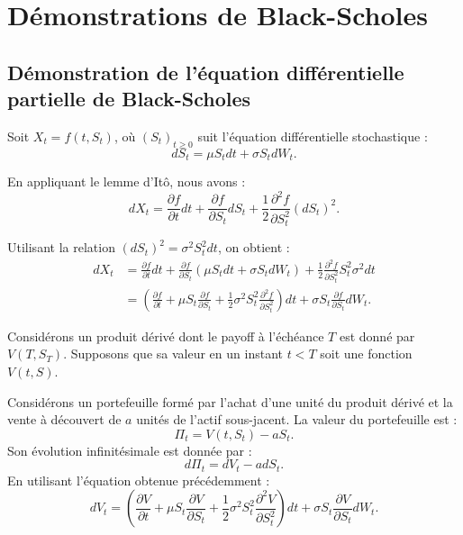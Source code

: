 
\chapter{Démonstrations de Black-Scholes}

\section{Démonstration de l'équation différentielle partielle de Black-Scholes}
\label{app:BS edp}

Soit $X_t = f(t, S_t)$, où $(S_t)_{t\geq0}$ suit l'équation différentielle stochastique :
\begin{equation}
    dS_t = \mu S_t dt + \sigma S_t dW_t.
\end{equation}

En appliquant le lemme d'Itô, nous avons :
\begin{equation}
    dX_t = \frac{\partial f}{\partial t} dt + \frac{\partial f}{\partial S_t} dS_t + \frac{1}{2} \frac{\partial^2 f}{\partial S_t^2} (dS_t)^2.
\end{equation}

Utilisant la relation $(dS_t)^2 = \sigma^2 S_t^2 dt$, on obtient :
\begin{align}
    dX_t &= \frac{\partial f}{\partial t} dt + \frac{\partial f}{\partial S_t} (\mu S_t dt + \sigma S_t dW_t) + \frac{1}{2} \frac{\partial^2 f}{\partial S_t^2} S_t^2 \sigma^2 dt \\
    &= \left( \frac{\partial f}{\partial t} + \mu S_t \frac{\partial f}{\partial S_t} + \frac{1}{2} \sigma^2 S_t^2 \frac{\partial^2 f}{\partial S_t^2} \right) dt + \sigma S_t \frac{\partial f}{\partial S_t} dW_t.
\end{align}

Considérons un produit dérivé dont le payoff à l'échéance $T$ est donné par $V(T, S_T)$. Supposons que sa valeur en un instant $t<T$ soit une fonction $V(t, S)$. 

Considérons un portefeuille formé par l'achat d'une unité du produit dérivé et la vente à découvert de $a$ unités de l'actif sous-jacent. La valeur du portefeuille est :
\begin{equation}
    \Pi_t = V(t, S_t) - a S_t.
\end{equation}
Son évolution infinitésimale est donnée par :
\begin{equation}
    d\Pi_t = dV_t - a dS_t.
\end{equation}
En utilisant l'équation obtenue précédemment :
\begin{equation}
    dV_t = \left( \frac{\partial V}{\partial t} + \mu S_t \frac{\partial V}{\partial S_t} + \frac{1}{2} \sigma^2 S_t^2 \frac{\partial^2 V}{\partial S_t^2} \right) dt + \sigma S_t \frac{\partial V}{\partial S_t} dW_t.
\end{equation}

